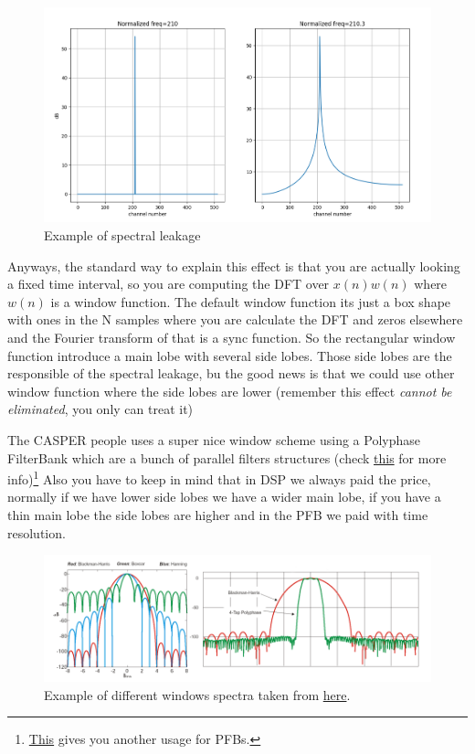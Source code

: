  \begin{figure}[h]
     \centering
     \includegraphics[scale=0.3]{images/leakage.png}
     \caption{Example of spectral leakage}
     \label{fig:leakage}
 \end{figure}

 Anyways, the standard way to explain this effect is that you are actually looking a fixed time interval, so you are computing the DFT over $x(n)w(n)$ where $w(n)$ is a window function. The default window function its just a box shape with ones in the N samples where you are calculate the DFT and zeros elsewhere and the Fourier transform of that is a sync function. So the rectangular window function introduce a main lobe with several side lobes. Those side lobes are the responsible of the spectral leakage, bu the good news is that we could use other window function where the side lobes are lower (remember this effect \emph{cannot be eliminated}, you only can treat it)
 
 
 The CASPER people uses a super nice window scheme using a Polyphase FilterBank which are a bunch of parallel filters structures (check \href{https://arxiv.org/abs/1607.03579}{this} for more info)\footnote{ \href{https://ieeexplore.ieee.org/document/7366712}{This} gives you another usage for PFBs.}
 Also you have to keep in mind that in DSP we always paid the price, normally if we have lower side lobes we have a wider main lobe, if you have a thin main lobe the side lobes are higher and in the PFB we paid with time resolution.
 
 \begin{figure}
     \centering
     \includegraphics[scale=0.5]{images/pfb.png}
     \caption{Example of different windows spectra taken from \href{https://web.njit.edu/~gary/728/Lecture8.html}{here}.}
     \label{fig:pfb}
 \end{figure}
 


